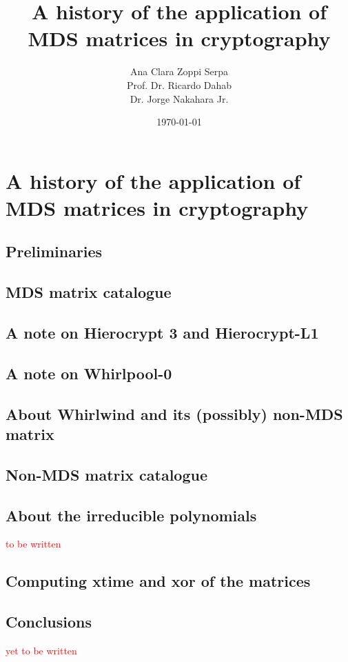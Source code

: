 \documentclass{report}
\title{A history of the application of MDS matrices in cryptography}
\author{Ana Clara Zoppi Serpa\\ Prof. Dr. Ricardo Dahab \\ Dr. Jorge Nakahara Jr.}
\date{\today}
\begin{document}

\maketitle

\tableofcontents

\chapter{A history of the application of MDS matrices in cryptography}


\section{Preliminaries}


\section{MDS matrix catalogue}




\section{A note on Hierocrypt 3 and Hierocrypt-L1}


\section{A note on Whirlpool-0}\label{sec:whirlpool}


\section{About Whirlwind and its (possibly) non-MDS matrix}\label{sec:whirlwind-non-mds}


\section{Non-MDS matrix catalogue}


\section{About the irreducible polynomials}
\textcolor{red}{to be written}


\section{Computing \textbf{xtime} and \textbf{xor} of the matrices}



\section{Conclusions}
\textcolor{red}{yet to be written}



\end{document}
